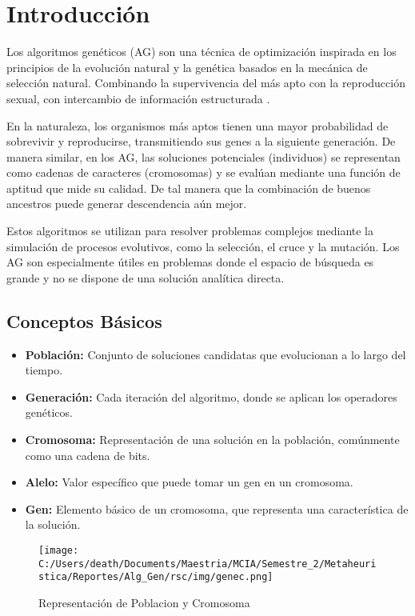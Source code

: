 \section{Introducción}

Los algoritmos genéticos (AG) son una técnica de optimización inspirada en los principios de la evolución natural y la genética
basados en la mecánica de selección natural. Combinando la supervivencia del más apto con la reproducción sexual, con intercambio
de información estructurada \cite{marcos2010introduccion}. 

En la naturaleza, los organismos más aptos tienen una mayor probabilidad de sobrevivir y reproducirse, transmitiendo sus genes
a la siguiente generación. De manera similar, en los AG, las soluciones potenciales (individuos) se representan como cadenas de
caracteres (cromosomas) y se evalúan mediante una función de aptitud que mide su calidad. De tal manera que la combinación de buenos
ancestros puede generar descendencia aún mejor.

Estos algoritmos se utilizan para resolver problemas complejos mediante
la simulación de procesos evolutivos, como la selección, el cruce y la mutación. Los AG son especialmente útiles en problemas donde el espacio de búsqueda es grande y no se dispone de
una solución analítica directa.

\subsection{Conceptos Básicos}
\begin{itemize}
    \item \textbf{Población:} Conjunto de soluciones candidatas que evolucionan a lo largo del tiempo.
    \item \textbf{Generación:} Cada iteración del algoritmo, donde se aplican los operadores genéticos.
    \item \textbf{Cromosoma:} Representación de una solución en la población, comúnmente como una cadena de bits.
    \item \textbf{Alelo:} Valor específico que puede tomar un gen en un cromosoma.
    \item \textbf{Gen:} Elemento básico de un cromosoma, que representa una característica de la solución.
\end{itemize}

\begin{figure} [H]
    \centering
    \texttt{[image: C:/Users/death/Documents/Maestria/MCIA/Semestre\_2/Metaheuristica/Reportes/Alg\_Gen/rsc/img/genec.png]}
    \caption{Representación de Poblacion y Cromosoma}
    \label{Poblacion}
\end{figure}


